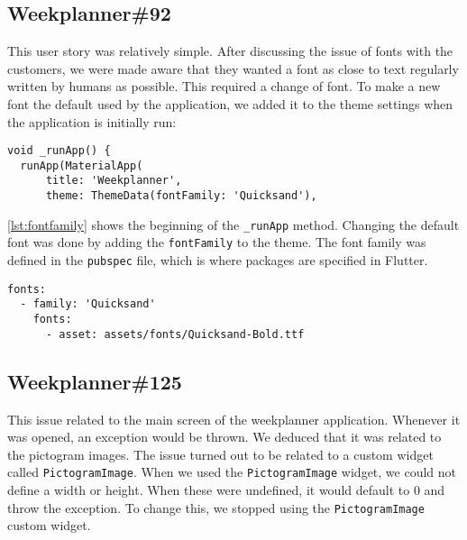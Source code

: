 \subsection{Weekplanner\#92}
This user story was relatively simple.
After discussing the issue of fonts with the customers, we were made aware that they wanted a font as close to text regularly written by humans as possible.
This required a change of font.
To make a new font the default used by the application, we added it to the theme settings when the application is initially run:

\begin{lstlisting}[caption={An excerpt of the run method},label={lst:fontfamily}]
  void _runApp() {
  runApp(MaterialApp(
      title: 'Weekplanner',
      theme: ThemeData(fontFamily: 'Quicksand'),
\end{lstlisting}
\autoref{lst:fontfamily} shows the beginning of the \texttt{\_runApp} method.
Changing the default font was done by adding the \texttt{fontFamily} to the theme.
The font family was defined in the \texttt{pubspec} file, which is where packages are specified in Flutter.
\begin{lstlisting}[caption={An excerpt of the pubspec file. Multiple assets are in the file for different styles, such as regular font.},label={lst:fontpubspec}]
  fonts:
  - family: 'Quicksand'
    fonts:
      - asset: assets/fonts/Quicksand-Bold.ttf
\end{lstlisting}

\subsection{Weekplanner\#125}
This issue related to the main screen of the weekplanner application.
Whenever it was opened, an exception would be thrown.
We deduced that it was related to the pictogram images. 
The issue turned out to be related to a custom widget called \texttt{PictogramImage}.
When we used the \texttt{PictogramImage} widget, we could not define a width or height.
When these were undefined, it would default to 0 and throw the exception.
To change this, we stopped using the \texttt{PictogramImage} custom widget.

